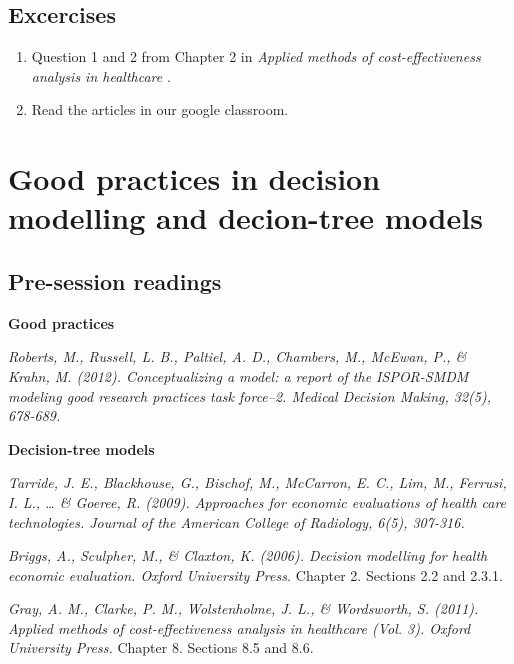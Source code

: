 \documentclass[
]{book}
\providecommand{\tightlist}{%
  \setlength{\itemsep}{0pt}\setlength{\parskip}{0pt}}
\begin{document}
\hypertarget{excercises-1}{%
\section{Excercises}\label{excercises-1}}

\begin{enumerate}
\def\labelenumi{\arabic{enumi}.}
\tightlist
\item
  Question 1 and 2 from Chapter 2 in \emph{Applied methods of cost-effectiveness analysis in healthcare }.
\item
  Read the articles in our google classroom.
\end{enumerate}

\hypertarget{tree}{%
\chapter{Good practices in decision modelling and decion-tree models}\label{tree}}

\hypertarget{pre-session-readings-2}{%
\section{Pre-session readings}\label{pre-session-readings-2}}

\textbf{Good practices}

\emph{Roberts, M., Russell, L. B., Paltiel, A. D., Chambers, M., McEwan, P., \& Krahn, M. (2012). Conceptualizing a model: a report of the ISPOR-SMDM modeling good research practices task force--2. Medical Decision Making, 32(5), 678-689.}

\textbf{Decision-tree models}

\emph{Tarride, J. E., Blackhouse, G., Bischof, M., McCarron, E. C., Lim, M., Ferrusi, I. L., \ldots{} \& Goeree, R. (2009). Approaches for economic evaluations of health care technologies. Journal of the American College of Radiology, 6(5), 307-316.}

\emph{Briggs, A., Sculpher, M., \& Claxton, K. (2006). Decision modelling for health economic evaluation. Oxford University Press.} Chapter 2. Sections 2.2 and 2.3.1.

\emph{Gray, A. M., Clarke, P. M., Wolstenholme, J. L., \& Wordsworth, S. (2011). Applied methods of cost-effectiveness analysis in healthcare (Vol. 3). Oxford University Press.} Chapter 8. Sections 8.5 and 8.6.

  
\end{document}
